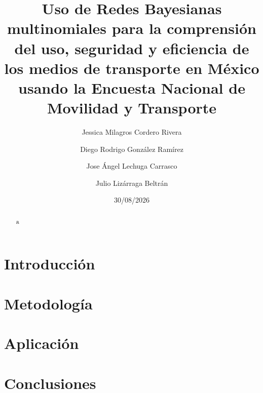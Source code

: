\documentclass[
  letterpaper,
  DIV=11,
  numbers=noendperiod]{scrartcl}
\title{Uso de Redes Bayesianas multinomiales para la comprensión del uso, seguridad y eficiencia de los medios de transporte en México usando la Encuesta Nacional de Movilidad y Transporte}
\author{
Jessica Milagros Cordero Rivera
\and
Diego Rodrigo González Ramírez
\and
Jose Ángel Lechuga Carrasco
\and
Julio Lizárraga Beltrán
}
\date{30/08/2026}
\begin{document}
\maketitle



\begin{abstract}
a
\end{abstract}



\section{Introducción}\label{Introducción}

\section{Metodología}\label{Metodología}

\section{Aplicación}\label{Aplicación}

\section{Conclusiones}\label{Conclusiones}
\end{document}
